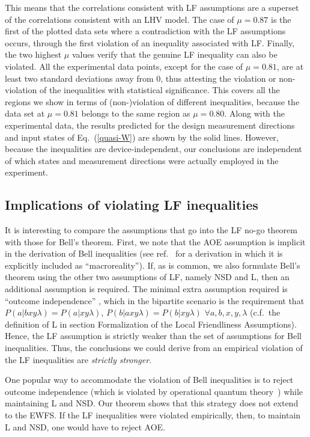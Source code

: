 \documentclass[aps,prx,twocolumn,superscriptaddress]{revtex4-1}
\theoremstyle{plain}
\begin{document}
This means that the correlations consistent with LF assumptions are a superset of the correlations consistent with an LHV model. The case of $\mu=0.87$ is the first of the plotted data sets where a contradiction with the LF assumptions occurs, through the first violation of an inequality associated with LF. Finally, the two highest $\mu$ values verify that the genuine LF inequality can also be violated. All the experimental data points, except for the case of $\mu=0.81$, are at least two standard deviations away from 0, thus attesting the violation or non-violation of the inequalities with statistical significance. This covers all the 
regions we show in terms of \mbox{(non-)violation} of different inequalities, because the data set at $\mu=0.81$ belongs to the same region as $\mu=0.80$. Along with the experimental data, the results predicted for the design measurement directions and input states of Eq.\ (\ref{quasi-W}) are shown by the solid lines. However, because the inequalities are  device-independent, 
our conclusions are independent of which states and measurement directions were actually employed in the experiment.



\subsection{Implications of violating LF inequalities }

It is interesting to compare the assumptions that go into the LF no-go theorem with those for Bell's theorem.  First, we note that the AOE assumption is implicit in the derivation of Bell inequalities (see ref.~\cite{Causarum} for a derivation in which it is explicitly included as ``macroreality''). If, as is common, we also formulate Bell's theorem using the other two assumptions of LF, namely NSD and L,
then an additional assumption is 
required. The minimal extra assumption required is ``outcome independence'' \cite{Shimony1984}, which in the bipartite scenario is the requirement that $P(a|bxy\lambda)=P(a|xy\lambda)$, $P(b|axy\lambda)=P(b|xy\lambda)$ $\forall a,b,x,y,\lambda$ (c.f.~the definition of L in section Formalization of the {Local Friendliness} Assumptions). Hence, the LF assumption is strictly weaker than the set of  assumptions for Bell inequalities. Thus, the conclusions we could derive from an empirical violation of the LF inequalities are \emph{strictly stronger}. 

One popular way to accommodate the violation of Bell inequalities is to reject outcome independence (which is violated by operational quantum theory~\cite{Causarum}) while maintaining L and NSD. 
Our theorem shows that this strategy does not extend to the EWFS. If the LF inequalities were violated empirically, then, to maintain L and NSD, one would have to reject AOE.
\end{document}
